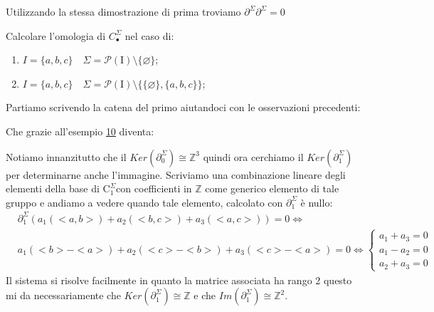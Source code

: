 \documentclass[11pt, a4paper, twoside]{article}
\begin{document}
\begin{oss}
	Utilizzando la stessa dimostrazione di prima troviamo $\partial^\Sigma\partial^\Sigma=0$
\end{oss}

\begin{ese}
	Calcolare l'omologia di $C_{\bullet}^\Sigma$ nel caso di:
	\begin{enumerate}
		\item $I=\{a,b,c\}\quad\Sigma=\mathscr{P}(\text{I})\setminus\{\varnothing\}$;
		\item $I=\{a,b,c\}\quad\Sigma=\mathscr{P}(\text{I})\setminus\{\{\varnothing\},\{a,b,c\}\}$;
	\end{enumerate}
\end{ese}
\begin{sol}
	Partiamo scrivendo la catena del primo aiutandoci con le osservazioni precedenti:
	\begin{center}
	\end{center}
	Che grazie all'esempio \hyperref[es 10]{10} diventa:
	\begin{center}
	\end{center}
	Notiamo innanzitutto che il $Ker(\partial^\Sigma_0)\cong\mathbb{Z}^3$ quindi ora cerchiamo il $Ker(\partial^\Sigma_1)$ per determinarne anche l'immagine. Scriviamo una combinazione lineare degli elementi della base di $\text{C}_{1}^\Sigma$con coefficienti in $\mathbb{Z}$ come generico elemento di tale gruppo e andiamo a vedere quando tale elemento, calcolato con $\partial^\Sigma_1$ è nullo:
	\begin{align*}
		&\partial^\Sigma_1(a_1(<a,b>)+a_2(<b,c>)+a_3(<a,c>))=0\iff \\ 
		&a_1(<b>-<a>)+a_2(<c>-<b>)+a_3(<c>-<a>)=0 \iff
		\begin{cases}
			a_1+a_3=0\\ 
			a_1-a_2=0\\
			a_2+a_3=0
		\end{cases}
	\end{align*} 
	Il sistema si risolve facilmente in quanto la matrice associata ha rango 2 questo mi da necessariamente che $Ker(\partial^\Sigma_1)\cong\mathbb{Z}$ e che $Im(\partial^\Sigma_1)\cong\mathbb{Z}^2$.


\end{sol}
\end{document}
